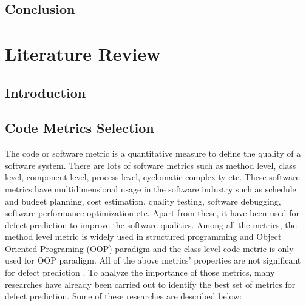 \documentclass[12pt]{report}
\begin{document}

\section{Conclusion}

\chapter{Literature Review}
\section{Introduction}
\section{Code Metrics Selection}
    
The code or software metric is a quantitative measure to define the quality of a software system. There are lots of software metrics such as method level, class level, component level, process level, cyclomatic complexity etc. 
These software metrics have multidimensional usage in the software industry such as schedule and budget planning, cost estimation, quality testing, software debugging, software performance optimization etc. Apart from these, it have been used for defect prediction to improve the software qualities. Among all the metrics, the method level metric is widely used in structured programming and Object Oriented Programing (OOP) paradigm and the class level code metric is only used for OOP paradigm. All of the above metrics' properties are not significant for defect prediction \cite{catal2009systematic,pai2007empirical,zhou2006empirical}. To analyze the importance of those metrics, many researches have already been carried out to identify the best set of metrics for defect prediction. Some of these researches are described below:
 
\end{document}
